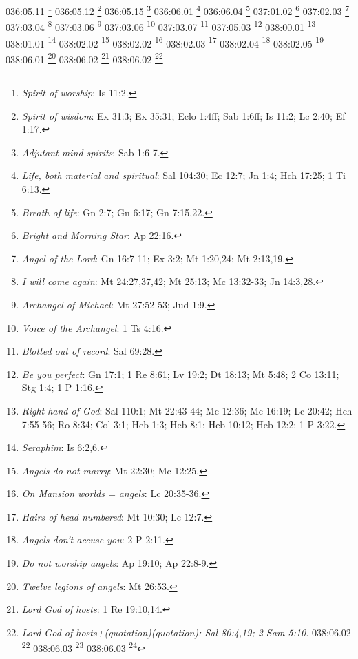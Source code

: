 {{{{{{{{{{{{{{{{{{{{{{036:05.11 \footnote{\textit{Spirit of worship}: Is 11:2.}
036:05.12 \footnote{\textit{Spirit of wisdom}: Ex 31:3; Ex 35:31; Eclo 1:4ff; Sab 1:6ff; Is 11:2; Lc 2:40; Ef 1:17.}
036:05.15 \footnote{\textit{Adjutant mind spirits}: Sab 1:6-7.}
036:06.01 \footnote{\textit{Life, both material and spiritual}: Sal 104:30; Ec 12:7; Jn 1:4; Hch 17:25; 1 Ti 6:13.}
036:06.04 \footnote{\textit{Breath of life}: Gn 2:7; Gn 6:17; Gn 7:15,22.}
037:01.02 \footnote{\textit{Bright and Morning Star}: Ap 22:16.}
037:02.03 \footnote{\textit{Angel of the Lord}: Gn 16:7-11; Ex 3:2; Mt 1:20,24; Mt 2:13,19.}
037:03.04 \footnote{\textit{I will come again}: Mt 24:27,37,42; Mt 25:13; Mc 13:32-33; Jn 14:3,28.}
037:03.06 \footnote{\textit{Archangel of Michael}: Mt 27:52-53; Jud 1:9.}
037:03.06 \footnote{\textit{Voice of the Archangel}: 1 Ts 4:16.}
037:03.07 \footnote{\textit{Blotted out of record}: Sal 69:28.}
037:05.03 \footnote{\textit{Be you perfect}: Gn 17:1; 1 Re 8:61; Lv 19:2; Dt 18:13; Mt 5:48; 2 Co 13:11; Stg 1:4; 1 P 1:16.}
038:00.01 \footnote{\textit{Right hand of God}: Sal 110:1; Mt 22:43-44; Mc 12:36; Mc 16:19; Lc 20:42; Hch 7:55-56; Ro 8:34; Col 3:1; Heb 1:3; Heb 8:1; Heb 10:12; Heb 12:2; 1 P 3:22.}
038:01.01 \footnote{\textit{Seraphim}: Is 6:2,6.}
038:02.02 \footnote{\textit{Angels do not marry}: Mt 22:30; Mc 12:25.}
038:02.02 \footnote{\textit{On Mansion worlds = angels}: Lc 20:35-36.}
038:02.03 \footnote{\textit{Hairs of head numbered}: Mt 10:30; Lc 12:7.}
038:02.04 \footnote{\textit{Angels don't accuse you}: 2 P 2:11.}
038:02.05 \footnote{\textit{Do not worship angels}: Ap 19:10; Ap 22:8-9.}
038:06.01 \footnote{\textit{Twelve legions of angels}: Mt 26:53.}
038:06.02 \footnote{\textit{Lord God of hosts}: 1 Re 19:10,14.}
038:06.02 \footnote{\textit{Lord God of hosts+(quotation)(quotation): Sal 80:4,19; 2 Sam 5:10.}
038:06.02 \footnote{\textit{Supreme commander}: Ap 19:14.}
038:06.03 \footnote{\textit{His mighty angels}: Ap 18:21.}
038:06.03 \footnote{\textit{His mighty angels (quotation)(quotation): 2 Ts 1:7; Ap 10:1.}
038:06.03 \footnote{\textit{Let all the angels worship}: Heb 1:6.}
039:02.13 \footnote{\textit{Sow mortal, reap morontia}: 1 Co 15:44.}
039:04.14 \footnote{\textit{Keys of the kingdom}: Mt 16:19.}
039:05.03 \footnote{\textit{Voices of the garden}: Gn 3:8.}
039:05.05 \footnote{\textit{Glory to God in Havona}: Lc 2:14.}
039:05.05 \footnote{\textit{Peace on earth, good will}: Lc 2:14.}
039:05.07 \footnote{\textit{Spirits of Trust}: Jue 9:15.}
039:05.12 \footnote{\textit{Angel wings}: Ex 25:20; Is 6:2; Ez 10:5.}
039:05.12 \footnote{\textit{Friction shields}: Ez 1:6,11,23; Ez 10:21.}
}}}}}}}}}}}}}}}}}}}}}}}}
